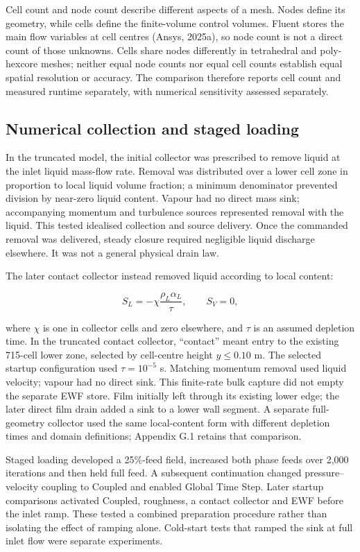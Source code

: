 Cell count and node count describe different aspects of a mesh. Nodes define its geometry, while cells define the finite-volume control volumes. Fluent stores the main flow variables at cell centres (Ansys, 2025a), so node count is not a direct count of those unknowns. Cells share nodes differently in tetrahedral and poly-hexcore meshes; neither equal node counts nor equal cell counts establish equal spatial resolution or accuracy. The comparison therefore reports cell count and measured runtime separately, with numerical sensitivity assessed separately.

\subsection{Numerical collection and staged loading}

In the truncated model, the initial collector was prescribed to remove liquid at the inlet liquid mass-flow rate. Removal was distributed over a lower cell zone in proportion to local liquid volume fraction; a minimum denominator prevented division by near-zero liquid content. Vapour had no direct mass sink; accompanying momentum and turbulence sources represented removal with the liquid. This tested idealised collection and source delivery. Once the commanded removal was delivered, steady closure required negligible liquid discharge elsewhere. It was not a general physical drain law.

The later contact collector instead removed liquid according to local content:

\[S_L=-\chi\frac{\rho_L\alpha_L}{\tau},\qquad S_V=0,\]

where \(\chi\) is one in collector cells and zero elsewhere, and \(\tau\) is an assumed depletion time. In the truncated contact collector, ``contact'' meant entry to the existing 715-cell lower zone, selected by cell-centre height \(y\leq0.10\) m. The selected startup configuration used \(\tau=10^{-5}\) s. Matching momentum removal used liquid velocity; vapour had no direct sink. This finite-rate bulk capture did not empty the separate EWF store. Film initially left through its existing lower edge; the later direct film drain added a sink to a lower wall segment. A separate full-geometry collector used the same local-content form with different depletion times and domain definitions; Appendix G.1 retains that comparison.

Staged loading developed a 25\%-feed field, increased both phase feeds over 2,000 iterations and then held full feed. A subsequent continuation changed pressure--velocity coupling to Coupled and enabled Global Time Step. Later startup comparisons activated Coupled, roughness, a contact collector and EWF before the inlet ramp. These tested a combined preparation procedure rather than isolating the effect of ramping alone. Cold-start tests that ramped the sink at full inlet flow were separate experiments.

